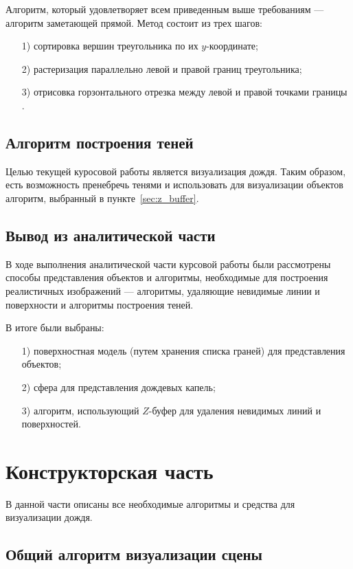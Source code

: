 Алгоритм, который удовлетворяет всем приведенным выше требованиям --- алгоритм заметающей прямой. 
Метод состоит из трех шагов:
\begin{enumerate}
\item[1)] сортировка вершин треугольника по их $y$-координате;
\item[2)] растеризация параллельно левой и правой границ треугольника;
\item[3)] отрисовка горзонтального отрезка между левой и правой точками границы \cite{Souvaine2005}.
\end{enumerate}

\section{Алгоритм построения теней}

Целью текущей куросовой работы является визуализация дождя. Таким образом, есть возможность пренебречь тенями и использовать для визуализации объектов алгоритм, выбранный в пункте~\ref{sec:z_buffer}.

\section*{Вывод из аналитической части}

В ходе выполнения аналитической части курсовой работы были рассмотрены способы представления объектов и алгоритмы, необходимые для построения реалистичных изображений --- алгоритмы, удаляющие невидимые линии и поверхности и алгоритмы построения теней.

В итоге были выбраны:

\begin{enumerate}
\item[1)]
поверхностная модель (путем хранения списка граней) для представления объектов;
\item[2)]
сфера для представления дождевых капель;
\item[3)]
алгоритм, использующий $Z$-буфер для удаления невидимых линий и поверхностей.
\end{enumerate}

\chapter{Конструкторская часть}

В данной части описаны все необходимые алгоритмы и средства для визуализации дождя.

\section{Общий алгоритм визуализации сцены}

